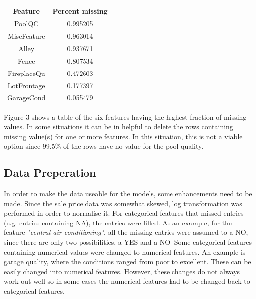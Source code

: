 \documentclass[a4paper,11pt]{article}
\begin{document}
\begin{table}
\centering

\begin{tabular}{|c|c|}
\hline
\textbf{Feature} & \textbf{Percent missing} \\ \hline
PoolQC           & 0.995205                 \\ \hline
MiscFeature      & 0.963014                 \\ \hline
Alley            & 0.937671                 \\ \hline
Fence            & 0.807534                 \\ \hline
FireplaceQu      & 0.472603                 \\ \hline
LotFrontage      & 0.177397                 \\ \hline
GarageCond       & 0.055479                 \\ \hline
\end{tabular}



\end{table}

Figure 3 shows a table of the six features having the highest fraction of missing values. In some situations it can be in helpful to delete the rows containing missing value(s) for one or more features. In this situation, this is not a viable option since 99.5\% of the rows have no value for the pool quality.

\clearpage
\subsection{Data Preperation}
In order to make the data useable for the models, some enhancements need to be made. Since the sale price data was somewhat skewed, log transformation was performed in order to normalise it. For categorical features that missed entries (e.g. entries containing NA), the entries were filled. As an example, for the feature \textit{"central air conditioning"}, all the missing entries were assumed to a NO, since there are only two possibilities, a YES and a NO. Some categorical features containing numerical values were changed to numerical features. An example is garage quality, where the conditions ranged from poor to excellent. These can be easily changed into numerical features. However, these changes do not always work out well so in some cases the numerical features had to be changed back to categorical features.\\
\end{document}
